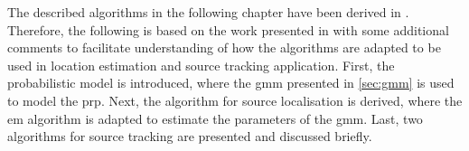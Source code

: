 The described algorithms in the following chapter have been derived in \cite{Schwartz2014}. Therefore, the following is based on the work presented in \cite{Schwartz2014} with some additional comments to facilitate understanding of how the algorithms are adapted to be used in location estimation and source tracking application. First, the probabilistic model is introduced, where the \gls{gmm} presented in \autoref{sec:gmm} is used to model the \gls{prp}. Next, the algorithm for source localisation is derived, where the \gls{em} algorithm is adapted to estimate the parameters of the \gls{gmm}. Last, two algorithms for source tracking are presented and discussed briefly.
